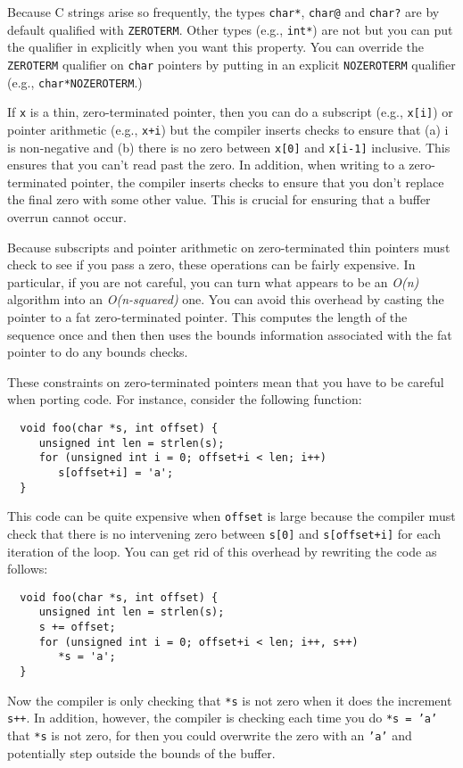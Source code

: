 Because C strings arise so frequently, the types \texttt{char*}, 
\texttt{char@} and \texttt{char?} are by default qualified
with \texttt{ZEROTERM}.  Other types (e.g., \texttt{int*}) are
not but you can put the qualifier in explicitly when you want
this property.  You can override the \texttt{ZEROTERM} qualifier
on \texttt{char} pointers by putting in an explicit
\texttt{NOZEROTERM} qualifier (e.g., \texttt{char*NOZEROTERM}.)

If \texttt{x} is a thin, zero-terminated pointer, then you can
do a subscript (e.g., \texttt{x[i]}) or pointer arithmetic
(e.g., \texttt{x+i}) but the compiler inserts checks
to ensure that (a) i is non-negative and (b) there is no
zero between \texttt{x[0]} and \texttt{x[i-1]} inclusive.
This ensures that you can't read past the zero.  
In addition, when writing to a zero-terminated pointer, the
compiler inserts checks to ensure that you don't replace
the final zero with some other value.  This is crucial for
ensuring that a buffer overrun cannot occur.  

Because subscripts and pointer arithmetic on zero-terminated
thin pointers must check to see if you pass a zero, these operations
can be fairly expensive.  In particular, if you are not careful,
you can turn what appears to be an \emph{O(n)} algorithm into
an \emph{O(n-squared)} one.  You can avoid this overhead by
casting the pointer to a fat zero-terminated pointer.  This
computes the length of the sequence once and then then uses
the bounds information associated with the fat pointer to do
any bounds checks.  

These constraints on zero-terminated pointers mean that you
have to be careful when porting code.  For instance, consider
the following function:
\begin{verbatim}
  void foo(char *s, int offset) {
     unsigned int len = strlen(s);
     for (unsigned int i = 0; offset+i < len; i++)
        s[offset+i] = 'a';
  }
\end{verbatim}
This code can be quite expensive when \texttt{offset} is large
because the compiler must check that there is no intervening
zero between \texttt{s[0]} and \texttt{s[offset+i]} for each
iteration of the loop.  You can get rid of this overhead by
rewriting the code as follows:
\begin{verbatim}
  void foo(char *s, int offset) {
     unsigned int len = strlen(s);
     s += offset;
     for (unsigned int i = 0; offset+i < len; i++, s++)
        *s = 'a';
  }
\end{verbatim}
Now the compiler is only checking that \texttt{*s} is not
zero when it does the increment \texttt{s++}.  In addition,
however, the compiler is checking each time you do \texttt{*s = 'a'}
that \texttt{*s} is not zero, for then you could overwrite
the zero with an \texttt{'a'} and potentially step outside
the bounds of the buffer. 

